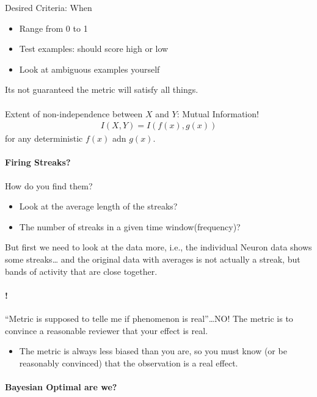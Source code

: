 \documentclass[../main.tex]{subfiles}
\begin{document}
Desired Criteria: When 
\begin{itemize}
    \item Range from 0 to 1
    \item Test examples: should score high or low
    \item Look at ambiguous examples yourself
\end{itemize}
Its not guaranteed the metric will satisfy all things.

\paragraph*{} Extent of non-independence between $X$ and $Y$: Mutual Information!
\begin{align*}
    I(X,Y) = I(f(x), g(x))
\end{align*}
for any deterministic $f(x)$ adn $g(x)$.

\paragraph*{Firing Streaks?} How do you find them?
\begin{itemize}
    \item Look at the average length of the streaks?
    \item The number of streaks in a given time window(frequency)?
\end{itemize}
But first we need to look at the data more, i.e., the individual Neuron data shows some streaks\dots
and the original data with averages is not actually a streak, but bands of activity that are close
together.

\paragraph*{!} ``Metric is supposed to telle me if phenomenon is real''\dots NO! The metric is to
convince a reasonable reviewer that your effect is real. 
\begin{itemize}
    \item The metric is always less biased than you are, so you must know (or be reasonably convinced) 
    that the observation is a real effect.
\end{itemize}

\paragraph*{Bayesian Optimal are we?}

\newpage
\end{document}
